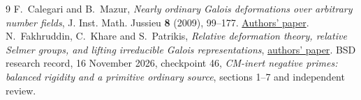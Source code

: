 \documentclass[11pt]{article}
\begin{document}
\begin{thebibliography}{9}
 F.~Calegari and B.~Mazur,
\emph{Nearly ordinary Galois deformations over arbitrary number fields},
J. Inst. Math. Jussieu \textbf{8} (2009), 99--177.
\href{https://www.math.uchicago.edu/~fcale/papers/ordinary.pdf}{Authors' paper}.
 N.~Fakhruddin, C.~Khare and S.~Patrikis,
\emph{Relative deformation theory, relative Selmer groups, and lifting
irreducible Galois representations},
\href{https://par.nsf.gov/servlets/purl/10324335}{authors' paper}.
 BSD research record, 16 November 2026,
checkpoint 46, \emph{CM-inert negative primes: balanced rigidity and
a primitive ordinary source}, sections 1--7 and independent review.
\end{thebibliography}
\end{document}
